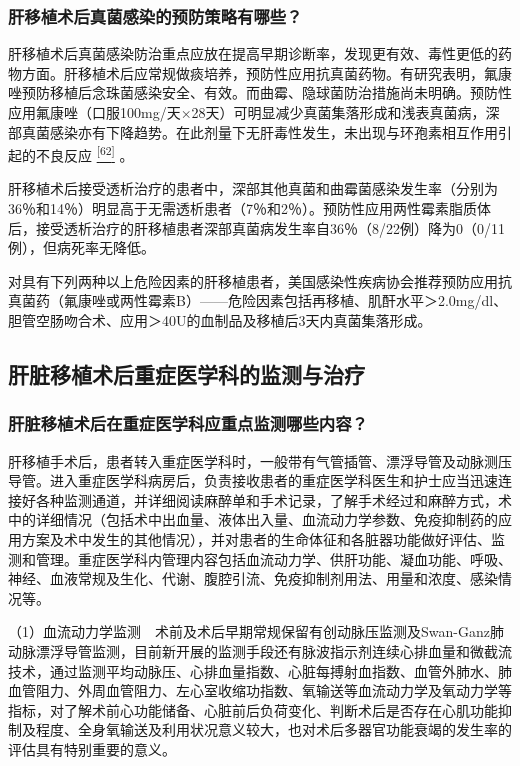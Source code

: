 \subsubsection{肝移植术后真菌感染的预防策略有哪些？}

肝移植术后真菌感染防治重点应放在提高早期诊断率，发现更有效、毒性更低的药物方面。肝移植术后应常规做痰培养，预防性应用抗真菌药物。有研究表明，氟康唑预防移植后念珠菌感染安全、有效。而曲霉、隐球菌防治措施尚未明确。预防性应用氟康唑（口服100mg/天×28天）可明显减少真菌集落形成和浅表真菌病，深部真菌感染亦有下降趋势。在此剂量下无肝毒性发生，未出现与环孢素相互作用引起的不良反应
\protect\hyperlink{text00020.htmlux5cux23ch62-19}{\textsuperscript{{[}62{]}}}
。

肝移植术后接受透析治疗的患者中，深部其他真菌和曲霉菌感染发生率（分别为36％和14％）明显高于无需透析患者（7％和2％）。预防性应用两性霉素脂质体后，接受透析治疗的肝移植患者深部真菌病发生率自36％（8/22例）降为0（0/11例），但病死率无降低。

对具有下列两种以上危险因素的肝移植患者，美国感染性疾病协会推荐预防应用抗真菌药（氟康唑或两性霉素B）------危险因素包括再移植、肌酐水平＞2.0mg/dl、胆管空肠吻合术、应用＞40U的血制品及移植后3天内真菌集落形成。

\subsection{肝脏移植术后重症医学科的监测与治疗}

\subsubsection{肝脏移植术后在重症医学科应重点监测哪些内容？}

肝移植手术后，患者转入重症医学科时，一般带有气管插管、漂浮导管及动脉测压导管。进入重症医学科病房后，负责接收患者的重症医学科医生和护士应当迅速连接好各种监测通道，并详细阅读麻醉单和手术记录，了解手术经过和麻醉方式，术中的详细情况（包括术中出血量、液体出入量、血流动力学参数、免疫抑制药的应用方案及术中发生的其他情况），并对患者的生命体征和各脏器功能做好评估、监测和管理。重症医学科内管理内容包括血流动力学、供肝功能、凝血功能、呼吸、神经、血液常规及生化、代谢、腹腔引流、免疫抑制剂用法、用量和浓度、感染情况等。

（1）血流动力学监测　术前及术后早期常规保留有创动脉压监测及Swan-Ganz肺动脉漂浮导管监测，目前新开展的监测手段还有脉波指示剂连续心排血量和微截流技术，通过监测平均动脉压、心排血量指数、心脏每搏射血指数、血管外肺水、肺血管阻力、外周血管阻力、左心室收缩功指数、氧输送等血流动力学及氧动力学等指标，对了解术前心功能储备、心脏前后负荷变化、判断术后是否存在心肌功能抑制及程度、全身氧输送及利用状况意义较大，也对术后多器官功能衰竭的发生率的评估具有特别重要的意义。


